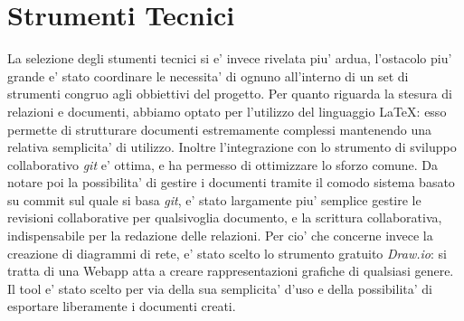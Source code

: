 \documentclass{report}
\begin{document}
		\section{Strumenti Tecnici}
			La selezione degli stumenti tecnici si e' invece rivelata piu' ardua, l'ostacolo piu' grande e' stato coordinare
			le necessita' di ognuno all'interno di un set di strumenti congruo agli obbiettivi del progetto.
			Per quanto riguarda la stesura di relazioni e documenti, abbiamo optato per l'utilizzo del linguaggio \LaTeX:
			esso permette di strutturare documenti estremamente complessi mantenendo una relativa semplicita' di utilizzo.
			Inoltre l'integrazione con lo strumento di sviluppo collaborativo \emph{git} e' ottima, e ha permesso di
			ottimizzare lo sforzo comune. Da notare poi la possibilita' di gestire i documenti tramite il comodo sistema
			basato su commit sul quale si basa \emph{git}, e' stato largamente piu' semplice gestire le revisioni
			collaborative per qualsivoglia documento, e la scrittura collaborativa, indispensabile per la redazione delle
			relazioni.
			Per cio' che concerne invece la creazione di diagrammi di rete, e' stato scelto lo strumento gratuito
			\emph{Draw.io}: si tratta di una Webapp atta a creare rappresentazioni grafiche di qualsiasi genere.
			Il tool e' stato scelto per via della sua semplicita' d'uso e della possibilita' di esportare liberamente
			i documenti creati.
\end{document}
